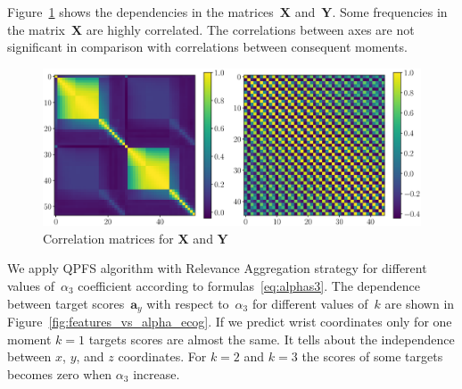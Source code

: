 \documentclass[12pt,twoside]{article}
\newcommand{\ba}{\mathbf{a}}
\newcommand{\bY}{\mathbf{Y}}
\newcommand{\bX}{\mathbf{X}}
\begin{document}
Figure~\ref{fig:corr_matrix} shows the dependencies in the matrices~$\bX$ and~$\bY$. Some frequencies in the matrix~$\bX$ are highly correlated. 
The correlations between axes are not significant in comparison with correlations between consequent moments.
\begin{figure}
	\includegraphics[width=\linewidth]{figs/corr_matrix.eps}
	\caption{Correlation matrices for $\bX$ and $\bY$}
	\label{fig:corr_matrix}
\end{figure}

We apply QPFS algorithm with Relevance Aggregation strategy for different values of~$\alpha_3$ coefficient according to formulas~\eqref{eq:alphas3}. 
The dependence between target scores~$\ba_y$ with respect to~$\alpha_3$ for different values of~$k$ are shown in Figure~\ref{fig:features_vs_alpha_ecog}. 
If we predict wrist coordinates only for one moment $k = 1$ targets scores are almost the same. 
It tells about the independence between $x$, $y$, and $z$ coordinates. 
For $k = 2$ and $k = 3$ the scores of some targets becomes zero when $\alpha_3$ increase. 
\end{document}
